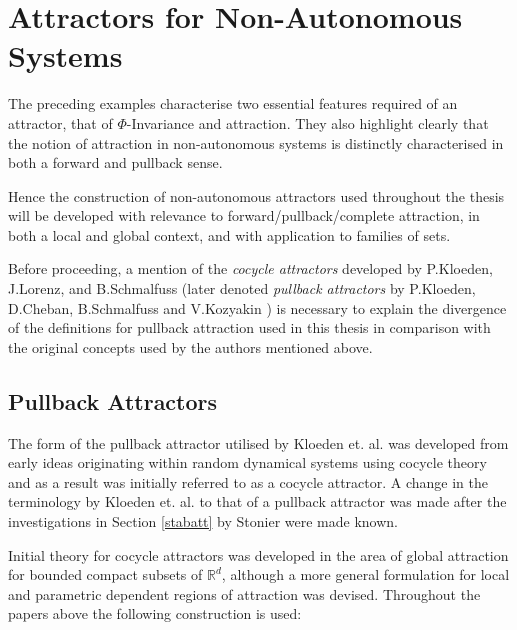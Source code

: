 \section{Attractors for Non-Autonomous Systems}
\label{ANSsec}

The preceding examples characterise two essential features
required of an attractor, that of $\Phi$-Invariance and
attraction. They also highlight clearly that the
notion of attraction in non-autonomous systems is distinctly
characterised in both a forward and pullback sense.

Hence the construction of non-autonomous attractors used throughout the thesis
will be developed with relevance to forward/pullback/complete attraction, in
both a local and global context, and with application to families of sets.

Before proceeding, a mention of the \textit{cocycle
attractors} developed by P.Kloeden, J.Lorenz, and B.Schmalfuss \cite{KlLo86,
KlSc96,PkSt97,Sc92} (later denoted  \textit{pullback
attractors} by P.Kloeden, D.Cheban, B.Schmalfuss and V.Kozyakin
\cite{ChKlSc98,ChKlSc00,Kl98,KlKo99,KlKo00, KlKo01}) is necessary to explain
the divergence of the definitions for pullback attraction used in
this thesis in comparison with the original concepts used by the authors
mentioned above.

\subsection{Pullback Attractors}

The form of the pullback attractor utilised by Kloeden et. al. was developed
from early ideas originating within random dynamical systems using cocycle
theory and as a result was initially referred to as a cocycle attractor. A
change in the terminology by Kloeden et. al.  to that of a pullback attractor
was made after the investigations in Section \ref{stabatt} by Stonier were made
known.

Initial theory for cocycle attractors was developed in the area of
global attraction for bounded compact subsets of $\mathbb{R}^d$,
although a more general formulation for local and parametric
dependent regions of attraction was devised. Throughout the papers
above \cite{ChKlSc98,ChKlSc00,Kl98,KlKo99,KlKo00, KlKo01} the
following construction is used:

